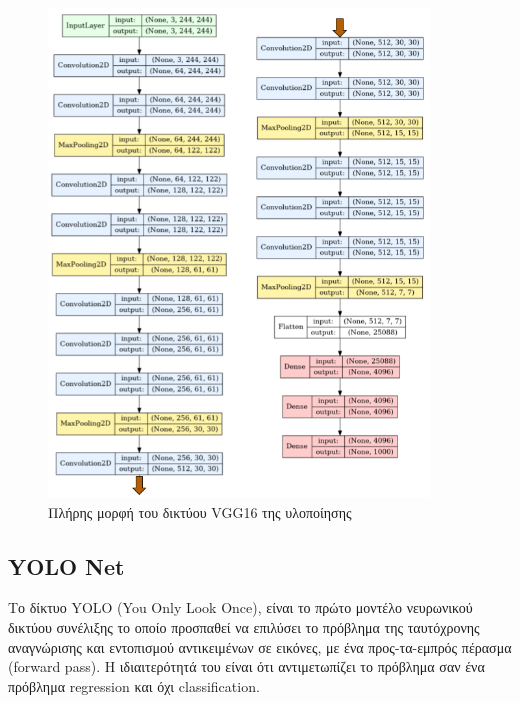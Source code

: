 \begin{figure}[!ht]
  \centering
  \includegraphics[width=0.9\textwidth]{./images/chapter5/vgg16.png}
  \caption[Πλήρης μορφή του δικτύου VGG16 της υλοποίησης]{Πλήρης μορφή του δικτύου VGG16 της υλοποίησης}
  \label{fig:vgg16}
\end{figure}



\subsection{YOLO Net}

Το δίκτυο YOLO (You Only Look Once), είναι το πρώτο μοντέλο νευρωνικού δικτύου
συνέλιξης το οποίο προσπαθεί να επιλύσει το πρόβλημα της ταυτόχρονης αναγνώρισης
και εντοπισμού αντικειμένων σε εικόνες, με ένα προς-τα-εμπρός πέρασμα (forward pass).
Η ιδιαιτερότητά του είναι ότι αντιμετωπίζει το πρόβλημα σαν ένα πρόβλημα
regression και όχι classification.

